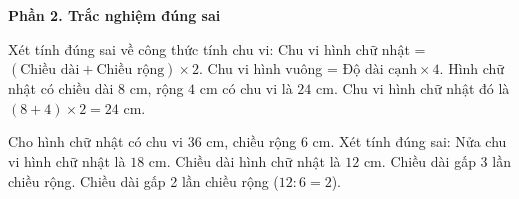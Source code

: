 \textbf{Phần 2. Trắc nghiệm đúng sai}

\begin{ex} %
Xét tính đúng sai về công thức tính chu vi:
\choiceTF
{\True Chu vi hình chữ nhật = $(\text{Chiều dài} + \text{Chiều rộng}) \times 2$.}
{\True Chu vi hình vuông = $\text{Độ dài cạnh} \times 4$.}
{Hình chữ nhật có chiều dài $8\text{ cm}$, rộng $4\text{ cm}$ có chu vi là $24\text{ cm}$.}
{\True Chu vi hình chữ nhật đó là $(8 + 4) \times 2 = 24\text{ cm}$.}
\end{ex}

\begin{ex} %
Cho hình chữ nhật có chu vi $36\text{ cm}$, chiều rộng $6\text{ cm}$. Xét tính đúng sai:
\choiceTF
{\True Nửa chu vi hình chữ nhật là $18\text{ cm}$.}
{\True Chiều dài hình chữ nhật là $12\text{ cm}$.}
{Chiều dài gấp 3 lần chiều rộng.}
{\True Chiều dài gấp 2 lần chiều rộng ($12 : 6 = 2$).}
\end{ex}


